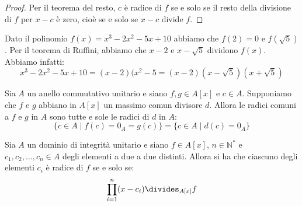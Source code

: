 \begin{proof}
	Per il teorema del resto, $c$ è radice di $f$ se e solo se il resto della divisione di $f$ per $x-c$ è zero, cioè se e solo se $x-c$ divide $f$.
\end{proof}

\begin{example}
	Dato il polinomio $f(x)=x^{3}-2x^{2}-5x+10$ abbiamo che $f(2)=0$ e $f(\sqrt{5})$. Per il teorema di Ruffini, abbiamo che $x-2$ e $x-\sqrt{5}$ dividono $f(x)$. Abbiamo infatti:
	\[x^{3}-2x^{2}-5x+10=(x-2)(x^{2}-5=(x-2)(x-\sqrt{5})(x+\sqrt{5})\]
\end{example}


\begin{corolbox}
	Sia $A$ un anello commutativo unitario e siano $f,g \in A[x]$ e $c \in A$. Supponiamo che $f$ e $g$ abbiano in $A[x]$ un massimo comun divisore $d$. Allora le radici comuni a $f$ e $g$ in $A$ sono tutte e sole le radici di $d$ in $A$:
	\begin{equation}
		\{c \in A \; | \; f(c)=0_{A}=g(c)\}=\{c \in A \; | \; d(c)=0_{A}\}
	\end{equation}
\end{corolbox}

\begin{teorbox}
	Sia $A$ un dominio di integrità unitario e siano $f \in A[x]$, $n \in \mathbb{N}^{*}$ e $c_{1},c_{2}, \ldots, c_{n} \in A$ degli elementi a due a due distinti. Allora si ha che ciascuno degli elementi $c_{i}$ è radice di $f$ se e solo se:
	\begin{displaymath}
		\prod_{i=1}^{n}(x-c_{i}) \divides_{A[x]} f
	\end{displaymath}
\end{teorbox}

